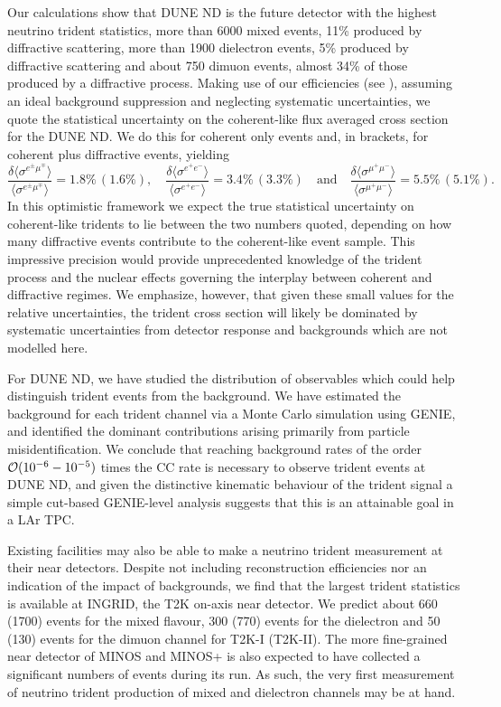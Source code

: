 Our calculations show that DUNE ND is the future detector with the highest neutrino trident statistics, more than 6000 mixed events, 11\% produced by diffractive scattering, more than 1900 dielectron events, 5\%  produced by diffractive scattering and about 750 dimuon events,
almost 34\% of those produced by a diffractive process. Making use of our efficiencies (see ), assuming an ideal background suppression and neglecting systematic uncertainties, we quote the statistical uncertainty on the coherent-like flux averaged cross section for the DUNE ND. We do this for coherent only events and, in brackets, for coherent plus diffractive events, yielding
%
\[\frac{\delta \langle \sigma^{e^\pm\mu^\mp} \rangle}{\langle \sigma^{e^\pm\mu^\mp} \rangle} =  1.8\% \, (1.6\%), \quad \frac{\delta \langle \sigma^{e^+e^-} \rangle}{\langle \sigma^{e^+e^-} \rangle} =  3.4\% \,(3.3\%) \quad \mathrm{and} \quad \frac{\delta \langle\sigma^{\mu^+\mu^-} \rangle}{\langle \sigma^{\mu^+\mu^-} \rangle} =  5.5\% \,(5.1\%).\]
%
In this optimistic framework we expect the true statistical uncertainty on coherent-like tridents to lie between the two numbers quoted, depending on how many diffractive events contribute to the coherent-like event sample. This impressive precision would provide unprecedented knowledge of the trident process and the nuclear effects governing the interplay between coherent and diffractive regimes. We emphasize, however, that given these small values for the relative uncertainties, the trident cross section will likely be dominated by systematic uncertainties from detector response and backgrounds which are not modelled here. 

For DUNE ND, we have studied the distribution of observables which could help distinguish trident events from the background. We have estimated the background for each trident channel via a Monte Carlo simulation using GENIE, and identified the dominant contributions arising primarily from particle misidentification.  
%
We conclude that reaching background rates of the order 
${\cal O}(10^{-6}-10^{-5})$ times the CC rate is necessary to observe trident events at DUNE ND, and given the distinctive kinematic behaviour of the trident signal a simple cut-based GENIE-level analysis suggests that this is an attainable goal in a LAr TPC. 

Existing facilities may also be able to make a neutrino trident measurement at their near detectors. Despite not including reconstruction efficiencies nor an indication of the impact of backgrounds, we find that the largest trident statistics is available at INGRID, the T2K on-axis near detector. We predict about 660 (1700) events for the mixed flavour, 300 (770) events for the dielectron and 50 (130) events for the dimuon channel for T2K-I (T2K-II). The more fine-grained near detector of MINOS and MINOS+ is also expected to have collected a significant numbers of events during its run. As such, the very first measurement of neutrino trident production of mixed and dielectron channels may be at hand.


